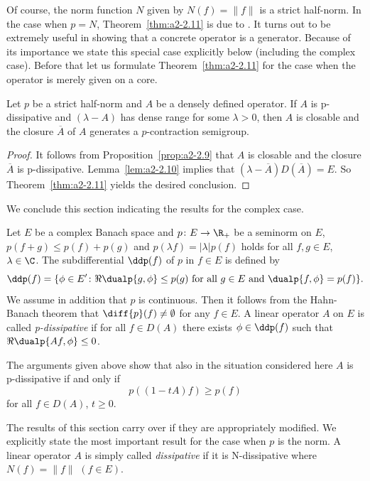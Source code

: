 Of course, the norm function $N$ given by $N(f) = \|f\|$ is a strict half-norm.
In the case when $p = N$, Theorem~\ref{thm:a2-2.11}    
is due to \textcite{lumerphillips:1961}.
It turns out to be extremely useful in showing that a concrete operator is a generator.
Because of its importance we state this special case explicitly below (including the complex case).
Before that let us formulate Theorem~\ref{thm:a2-2.11}   
for the case when the operator is merely given on a core.
\begin{corollary}\label{cor:a2-2.12}
Let $p$ be a strict half-norm and $A$ be a densely defined operator.
If\/ $A$ is p-dissipative and $(\lambda - A)$ has dense range for some $\lambda > 0$, then $A$ is closable and the closure $\overline{A}$ of\/ $A$ generates a $p$-contraction semigroup.
\end{corollary}
\begin{proof}
It follows from Proposition~\ref{prop:a2-2.9} that $A$ is closable and the closure $\overline{A}$ is p-dissipative.
Lemma~\ref{lem:a2-2.10} implies that $(\lambda- \overline{A})D(\overline{A}) = E$.
So Theorem~\ref{thm:a2-2.11} yields the desired conclusion.
\end{proof}
We conclude this section indicating the results for the complex case.

Let $E$ be a complex Banach space and $p \colon E \to \R_{+}$ 
be a seminorm on $E$, \ie $p(f + g) \leq p(f) + p(g)$ and $p(\lambda f) = |\lambda|p(f)$ holds for all $f, g \in E$, $\lambda \in \C$.
The subdifferential $\ddp(f)$ of\/ $p$ in $f \in E$ is defined by
\begin{equation}\label{eq:a2-4.15}
\ddp(f) = \{\phi \in E' \colon \Re\dualp{g,\phi} \leq p(g) \text{ for all } g \in E \text{ and } \dualp{f,\phi} = p(f)\}.
\end{equation}
We assume in addition that $p$ is continuous.
Then it follows from the Hahn-Banach theorem that $\diff{p}(f) \neq \emptyset$ for any $f \in E$.
A linear operator $A$ on $E$ is called \emph{p-dissipative} if for all $f \in D(A)$ there exists $\phi \in \ddp(f)$ such that $\Re\dualp{Af,\phi} \leq 0$.

The arguments given above show that also in the situation considered here $A$ is p-dissipative if and only if
\[
    p((1-tA)f) \geq p(f)
\]
for all $f \in D(A)$, $t \geq 0$.

The results of this section carry over if they are appropriately modified.
We explicitly state the most important result for the case when $p$ is the norm.
A linear operator $A$ is simply called \emph{dissipative} if it is N-dissipative where $N(f) = \|f\|$ $(f \in E)$.

